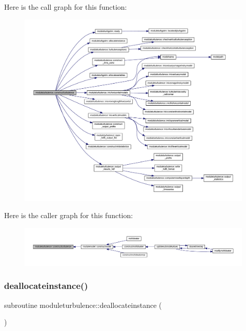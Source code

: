 Here is the call graph for this function\+:\nopagebreak
\begin{figure}[H]
\begin{center}
\leavevmode
\includegraphics[width=350pt]{namespacemoduleturbulence_ace39b4cf089aa70cd60b083a3e341bc9_cgraph}
\end{center}
\end{figure}
Here is the caller graph for this function\+:\nopagebreak
\begin{figure}[H]
\begin{center}
\leavevmode
\includegraphics[width=350pt]{namespacemoduleturbulence_ace39b4cf089aa70cd60b083a3e341bc9_icgraph}
\end{center}
\end{figure}
\mbox{\label{namespacemoduleturbulence_aad40d3e2593854d66c21ebbd92791ba0}} 
\subsubsection{\texorpdfstring{deallocateinstance()}{deallocateinstance()}}
{\footnotesize\ttfamily subroutine moduleturbulence\+::deallocateinstance (\begin{DoxyParamCaption}{ }\end{DoxyParamCaption})\hspace{0.3cm}{\ttfamily [private]}}

